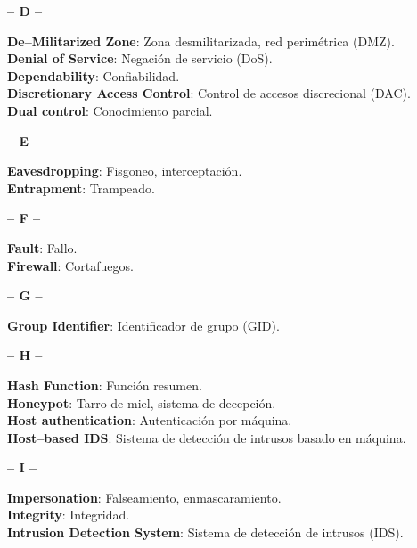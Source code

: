 \begin{center}
{\large {\bf -- D --}}\\
\end{center}
{\bf De--Militarized Zone}: Zona desmilitarizada, red perim\'etrica (DMZ).\\
{\bf Denial of Service}: Negaci\'on de servicio (DoS).\\
{\bf Dependability}: Confiabilidad.\\
{\bf Discretionary Access Control}: Control de accesos discrecional (DAC).\\
{\bf Dual control}: Conocimiento parcial.\\
\begin{center}
{\large {\bf -- E --}}\\
\end{center}
{\bf Eavesdropping}: Fisgoneo, interceptaci\'on.\\
{\bf Entrapment}: Trampeado.\\
\begin{center}
{\large {\bf -- F --}}\\
\end{center}
{\bf Fault}: Fallo.\\
{\bf Firewall}: Cortafuegos.\\
\begin{center}
{\large {\bf -- G --}}\\
\end{center}
{\bf Group Identifier}: Identificador de grupo (GID).\\
\begin{center}
{\large {\bf -- H --}}\\
\end{center}
{\bf Hash Function}: Funci\'on resumen.\\
{\bf Honeypot}: Tarro de miel, sistema de decepci\'on.\\
{\bf Host authentication}: Autenticaci\'on por m\'aquina.\\
{\bf Host--based IDS}: Sistema de detecci\'on de intrusos basado en m\'aquina.\\
\begin{center}
{\large {\bf -- I --}}\\
\end{center}
{\bf Impersonation}: Falseamiento, enmascaramiento.\\
{\bf Integrity}: Integridad.\\
{\bf Intrusion Detection System}: Sistema de detecci\'on de intrusos (IDS).\\
